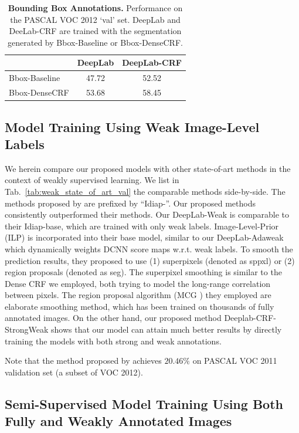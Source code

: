 \begin{table}
  \centering
  \caption{{\bf Bounding Box Annotations.} Performance on the PASCAL VOC 2012 `val' set. DeepLab and DeeLab-CRF are trained with the segmentation generated by Bbox-Baseline or Bbox-DenseCRF.}
  \begin{tabular}{| l | c | c |}
    \hline
     & DeepLab & DeepLab-CRF \\
    \hline
    Bbox-Baseline & 47.72 & 52.52 \\ 
    \hline
    Bbox-DenseCRF & 53.68 & 58.45 \\
    \hline
    \end{tabular}
  \label{tb:bbox_annot}
\end{table}

\subsection{Model Training Using Weak Image-Level Labels}
\label{sec:test_image}

We herein compare our proposed models with other state-of-art methods
in the context of weakly supervised learning. We list in
Tab.~\ref{tab:weak_state_of_art_val} the comparable methods
side-by-side. The methods proposed by \citet{pinheiro2014weakly} are
prefixed by ``Idiap-''. Our proposed methods consistently outperformed
their methods. Our DeepLab-Weak is comparable to their Idiap-base,
which are trained with only weak labels. Image-Level-Prior (ILP) is
incorporated into their base model, similar to our DeepLab-Adaweak
which dynamically weights DCNN score maps w.r.t. weak labels. To
smooth the prediction results, they proposed to use (1) superpixels
(denoted as sppxl) or (2) region proposals (denoted as seg). The
superpixel smoothing is similar to the Dense CRF we employed, both
trying to model the long-range correlation between pixels. The region
proposal algorithm (MCG \citep{arbelaez2014multiscale}) they employed
are elaborate smoothing method, which has been trained on thousands of
fully annotated images. On the other hand, our proposed method
Deeplab-CRF-StrongWeak shows that our model can attain much better
results by directly training the models with both strong and weak
annotations.

Note that the method proposed by \citet{pathak2014fully} achieves
$20.46\%$ on PASCAL VOC 2011 validation set (a subset of VOC 2012).

\subsection{Semi-Supervised Model Training Using Both Fully and Weakly Annotated Images}
\label{sec:test_semi}

